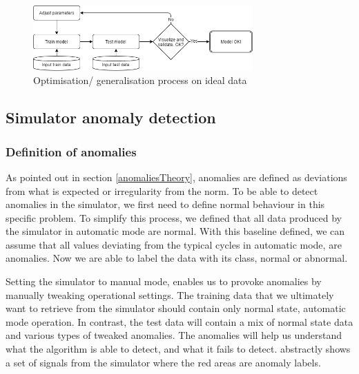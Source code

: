 \documentclass[english, a4paper]{report}
\begin{document}
{{{{                \begin{figure}[H]
                    \centering \includegraphics[width=0.75\textwidth]{anom-fake-opti}
                    \caption{Optimisation/ generalisation process on ideal data}
                    \label{fig:fakeOptiAD}
                \end{figure}
            }
        }
        
        \subsection{Simulator anomaly detection} \label{simuAD}
        {
            \subsubsection{Definition of anomalies} \label{defAnomalies}
            {
                As pointed out in section \ref{anomaliesTheory}, anomalies are defined as deviations from what is expected or irregularity from the norm. 
                To be able to detect anomalies in the simulator, we first need to define normal behaviour in this specific problem. To simplify this process, we defined that all data produced by the simulator in automatic mode are normal. With this baseline defined, we can assume that all values deviating from the typical cycles in automatic mode, are anomalies. Now we are able to label the data with its class, normal or abnormal. 
                \par 
                Setting the simulator to manual mode, enables us to provoke anomalies by manually tweaking operational settings.
                The training data that we ultimately want to retrieve from the simulator should contain only normal state, automatic mode operation. In contrast, the test data will contain a mix of normal state data and various types of tweaked anomalies. The anomalies will help us understand what the algorithm is able to detect, and what it fails to detect.  abstractly shows a set of signals from the simulator where the red areas are anomaly labels.
                
}}}}
\end{document}

